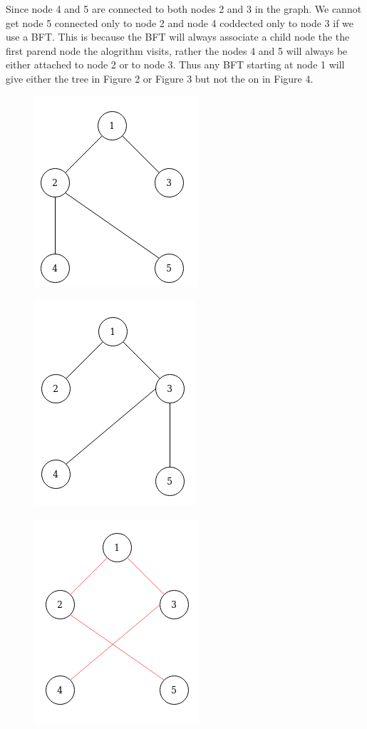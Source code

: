 \documentclass[12pt]{article}
\begin{document}
\begin{enumerate}
Since node 4 and 5 are connected to both nodes 2 and 3 in the graph. We cannot get node 5 connected only to node 2 and node 4 coddected only to node 3 if we use a BFT. This is because the BFT will always associate a child node the the first parend node the alogrithm visits, rather the nodes 4 and 5 will always be either attached to node 2 or to node 3. Thus any BFT starting at node 1 will give either the tree in Figure 2 or Figure 3 but not the on in Figure 4.
\begin{figure}[h]
	\caption{}
	\centering
	\includegraphics[scale=0.5]{p1-2.png}
\end{figure}
\begin{figure}[h]
	\caption{}
	\centering
	\includegraphics[scale=0.5]{p1-3.png}
\end{figure}
\begin{figure}[h!]
	\caption{}
	\centering
	\includegraphics[scale=0.5]{p1-4.png}
\end{figure}



\end{enumerate}
\end{document}
